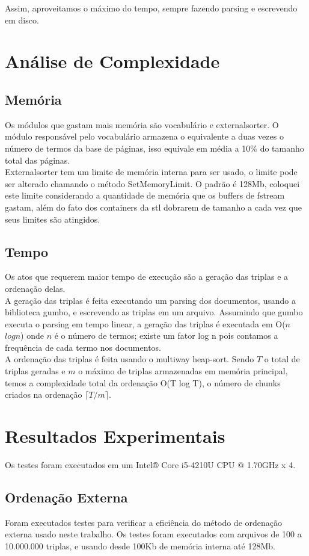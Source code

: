 \documentclass[11pt]{article}
\begin{document}
Assim, aproveitamos o máximo do tempo, sempre fazendo parsing e escrevendo em disco.


\section{Análise de Complexidade}

\subsection{Memória}

Os módulos que gastam mais memória são vocabulário e externalsorter. O módulo responsável pelo vocabulário armazena o equivalente a duas vezes o número de termos da base de páginas, isso equivale em média a 10$\%$ do tamanho total das páginas.\\
Externalsorter tem um limite de memória interna para ser usado, o limite pode ser alterado chamando o método SetMemoryLimit. O padrão é 128Mb, coloquei este limite considerando a quantidade de memória que os buffers de fstream gastam, além do fato dos containers da stl dobrarem de tamanho a cada vez que seus limites são atingidos.

\subsection{Tempo}
Os atos que requerem maior tempo de execução são a geração das triplas e a ordenação delas.\\
A geração das triplas é feita executando um parsing dos documentos, usando a biblioteca gumbo, e escrevendo as triplas em um arquivo. Assumindo que gumbo executa o parsing em tempo linear, a geração das triplas é executada em O($n$ $log n$) onde $n$ é o número de termos; existe um fator log n pois contamos a frequência de cada termo nos documentos.\\
A ordenação das triplas é feita usando o multiway heap-sort. Sendo $T$ o total de triplas geradas e $m$ o máximo de triplas armazenadas em memória principal, temos a complexidade total da ordenação O(T log T), o número de chunks criados na ordenação $\lceil T/m \rceil$.


\section{Resultados Experimentais}
Os testes foram executados em um Intel® Core i5-4210U CPU @ 1.70GHz x 4.

\subsection{Ordenação Externa}
Foram executados testes para verificar a eficiência do método de ordenação externa usado neste trabalho. Os testes foram executados com arquivos de 100 a 10.000.000 triplas, e usando desde 100Kb de memória interna até 128Mb.
\end{document}
